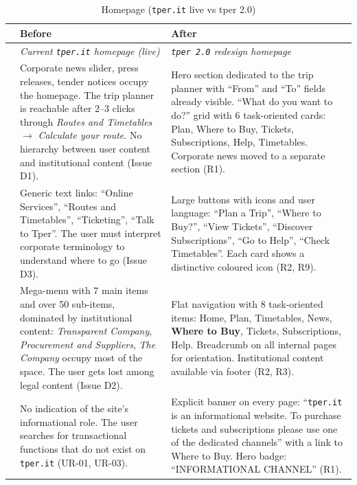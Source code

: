 \begin{table}[H]
\centering
\small
\renewcommand{\arraystretch}{1.4}
\begin{tabular}{|p{0.5cm}|p{7cm}|p{7cm}|}
\hline
& \textbf{Before} & \textbf{After} \\ \hline
\cellcolor{primaryColor!15} &
\textit{Current \texttt{tper.it} homepage (live)} &
\textit{\texttt{tper 2.0} redesign homepage} \\ \hline

\raisebox{0.5cm}{\rotatebox{90}{\textbf{Content}}} &
Corporate news slider, press releases, tender notices occupy the homepage. The trip planner is reachable after 2--3 clicks through \textit{Routes and Timetables} $\rightarrow$ \textit{Calculate your route}. No hierarchy between user content and institutional content (Issue D1). &
Hero section dedicated to the trip planner with ``From'' and ``To'' fields already visible. ``What do you want to do?'' grid with 6 task-oriented cards: Plan, Where to Buy, Tickets, Subscriptions, Help, Timetables. Corporate news moved to a separate section (R1). \\ \hline

\raisebox{0.5cm}{\rotatebox{90}{\textbf{CTAs}}} &
Generic text links: ``Online Services'', ``Routes and Timetables'', ``Ticketing'', ``Talk to Tper''. The user must interpret corporate terminology to understand where to go (Issue D3). &
Large buttons with icons and user language: ``Plan a Trip'', ``Where to Buy?'', ``View Tickets'', ``Discover Subscriptions'', ``Go to Help'', ``Check Timetables''. Each card shows a distinctive coloured icon (R2, R9). \\ \hline

\raisebox{0.5cm}{\rotatebox{90}{\textbf{Navigation}}} &
Mega-menu with 7 main items and over 50 sub-items, dominated by institutional content: \textit{Transparent Company}, \textit{Procurement and Suppliers}, \textit{The Company} occupy most of the space. The user gets lost among legal content (Issue D2). &
Flat navigation with 8 task-oriented items: Home, Plan, Timetables, News, \textbf{Where to Buy}, Tickets, Subscriptions, Help. Breadcrumb on all internal pages for orientation. Institutional content available via footer (R2, R3). \\ \hline

\raisebox{0.5cm}{\rotatebox{90}{\textbf{Info}}} &
No indication of the site's informational role. The user searches for transactional functions that do not exist on \texttt{tper.it} (UR-01, UR-03). &
Explicit banner on every page: ``\texttt{tper.it} is an informational website. To purchase tickets and subscriptions please use one of the dedicated channels'' with a link to Where to Buy. Hero badge: ``INFORMATIONAL CHANNEL'' (R1). \\ \hline
\end{tabular}
\caption{Homepage (\texttt{tper.it} live vs tper 2.0)}
\label{tab:comparison-home}
\end{table}

